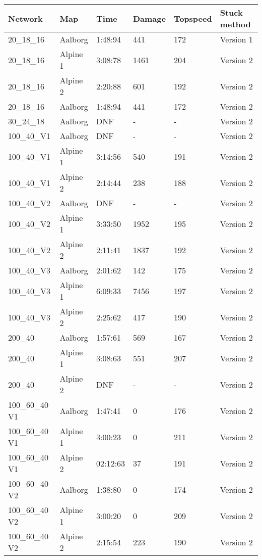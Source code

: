 \documentclass[pt,twoside,a4paper]{article}
\begin{document}
\begin{table}[h]
\noindent
\begin{tabular}{llllll}
 \textbf{Network} & \textbf{Map} & \textbf{Time} & \textbf{Damage} & \textbf{Topspeed}  & \textbf{Stuck method} \\ \hline
 20\_18\_16  & Aalborg & 1:48:94 & 441 & 172 & Version 1 \\
 20\_18\_16 & Alpine 1 & 3:08:78  & 1461 & 204 & Version 2    \\
 20\_18\_16 & Alpine 2 & 2:20:88  & 601 & 192 & Version 2    \\
 20\_18\_16  & Aalborg & 1:48:94 & 441 & 172 & Version 2 \\ \hline
 30\_24\_18  & Aalborg &  DNF & - & - & Version 2 \\ \hline
 100\_40\_V1 & Aalborg & DNF & - & - & Version 2 \\
 100\_40\_V1 & Alpine 1 & 3:14:56 & 540 & 191 & Version 2 \\
 100\_40\_V1 & Alpine 2 & 2:14:44 & 238 & 188 & Version 2 \\ \hline
 100\_40\_V2 & Aalborg & DNF & - & - & Version 2 \\
 100\_40\_V2 & Alpine 1 & 3:33:50 & 1952 & 195 & Version 2 \\
 100\_40\_V2 & Alpine 2 & 2:11:41 & 1837 & 192 & Version 2 \\ \hline
 100\_40\_V3 & Aalborg & 2:01:62 & 142 & 175 & Version 2 \\
 100\_40\_V3 & Alpine 1 & 6:09:33 & 7456 & 197 & Version 2 \\
 100\_40\_V3 & Alpine 2 & 2:25:62 & 417 & 190 & Version 2 \\ \hline
 200\_40  & Aalborg &  1:57:61 & 569 & 167 & Version 2 \\ 
 200\_40 & Alpine 1 & 3:08:63 & 551 & 207 & Version 2    \\
 200\_40 & Alpine 2 & DNF & - & - & Version 2   \\ \hline 
 100\_60\_40 V1 &  Aalborg & 1:47:41 & 0 & 176 & Version 2 \\
 100\_60\_40 V1 & Alpine 1& 3:00:23 & 0 & 211 & Version 2 \\  
 100\_60\_40 V1 & Alpine 2 & 02:12:63 & 37 & 191 & Version 2   \\ \hline
 100\_60\_40 V2 & Aalborg & 1:38:80  & 0 & 174 & Version 2   \\ 
 100\_60\_40 V2 & Alpine 1 & 3:00:20 & 0 & 209 & Version 2	\\
 100\_60\_40 V2 & Alpine 2 & 2:15:54 & 223 & 190 & Version 2 \\ \hline

\end{tabular}
\end{table}
\end{document}
